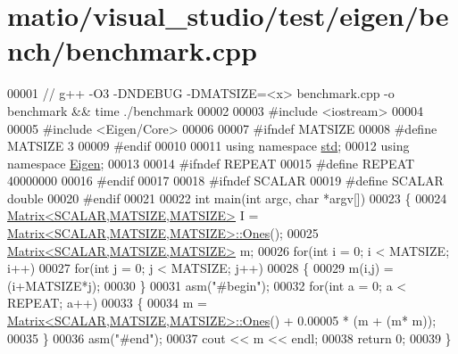 \hypertarget{matio_2visual__studio_2test_2eigen_2bench_2benchmark_8cpp_source}{}\section{matio/visual\+\_\+studio/test/eigen/bench/benchmark.cpp}
\label{matio_2visual__studio_2test_2eigen_2bench_2benchmark_8cpp_source}

\begin{DoxyCode}
00001 \textcolor{comment}{// g++ -O3 -DNDEBUG -DMATSIZE=<x> benchmark.cpp -o benchmark && time ./benchmark}
00002 
00003 \textcolor{preprocessor}{#include <iostream>}
00004 
00005 \textcolor{preprocessor}{#include <Eigen/Core>}
00006 
00007 \textcolor{preprocessor}{#ifndef MATSIZE}
00008 \textcolor{preprocessor}{#define MATSIZE 3}
00009 \textcolor{preprocessor}{#endif}
00010 
00011 \textcolor{keyword}{using namespace }\hyperlink{namespacestd}{std};
00012 \textcolor{keyword}{using namespace }\hyperlink{namespace_eigen}{Eigen};
00013 
00014 \textcolor{preprocessor}{#ifndef REPEAT}
00015 \textcolor{preprocessor}{#define REPEAT 40000000}
00016 \textcolor{preprocessor}{#endif}
00017 
00018 \textcolor{preprocessor}{#ifndef SCALAR}
00019 \textcolor{preprocessor}{#define SCALAR double}
00020 \textcolor{preprocessor}{#endif}
00021 
00022 \textcolor{keywordtype}{int} main(\textcolor{keywordtype}{int} argc, \textcolor{keywordtype}{char} *argv[])
00023 \{
00024     \hyperlink{group___core___module_class_eigen_1_1_matrix}{Matrix<SCALAR,MATSIZE,MATSIZE>} I = 
      \hyperlink{group___core___module_class_eigen_1_1_matrix}{Matrix<SCALAR,MATSIZE,MATSIZE>::Ones}();
00025     \hyperlink{group___core___module_class_eigen_1_1_matrix}{Matrix<SCALAR,MATSIZE,MATSIZE>} m;
00026     \textcolor{keywordflow}{for}(\textcolor{keywordtype}{int} i = 0; i < MATSIZE; i++)
00027         \textcolor{keywordflow}{for}(\textcolor{keywordtype}{int} j = 0; j < MATSIZE; j++)
00028         \{
00029             m(i,j) = (i+MATSIZE*j);
00030         \}
00031     \textcolor{keyword}{asm}(\textcolor{stringliteral}{"#begin"});
00032     \textcolor{keywordflow}{for}(\textcolor{keywordtype}{int} a = 0; a < REPEAT; a++)
00033     \{
00034         m = \hyperlink{group___core___module_class_eigen_1_1_matrix}{Matrix<SCALAR,MATSIZE,MATSIZE>::Ones}() + 0.00005 * (m + (m*
      m));
00035     \}
00036     \textcolor{keyword}{asm}(\textcolor{stringliteral}{"#end"});
00037     cout << m << endl;
00038     \textcolor{keywordflow}{return} 0;
00039 \}
\end{DoxyCode}
